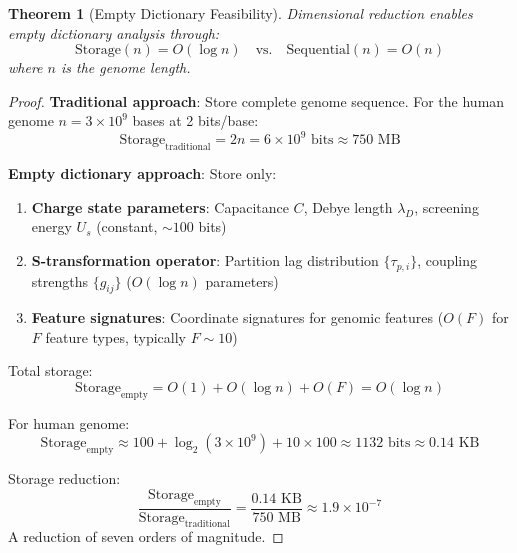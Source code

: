 \documentclass[11pt,a4paper]{article}
\newtheorem{theorem}{Theorem}[section]
\theoremstyle{remark}
\begin{document}
\begin{theorem}[Empty Dictionary Feasibility]
\label{thm:empty_dictionary_feasibility}
Dimensional reduction enables empty dictionary analysis through:
\begin{equation}
\text{Storage}(n) = O(\log n) \quad \text{vs.} \quad \text{Sequential}(n) = O(n)
\end{equation}
where $n$ is the genome length.
\end{theorem}

\begin{proof}
\textbf{Traditional approach}: Store complete genome sequence. For the human genome $n = 3 \times 10^9$ bases at 2 bits/base:
\begin{equation}
\text{Storage}_{\text{traditional}} = 2n = 6 \times 10^9 \text{ bits} \approx 750 \text{ MB}
\end{equation}

\textbf{Empty dictionary approach}: Store only:
\begin{enumerate}
\item \textbf{Charge state parameters}: Capacitance $C$, Debye length $\lambda_D$, screening energy $U_s$ (constant, $\sim 100$ bits)
\item \textbf{S-transformation operator}: Partition lag distribution $\{\tau_{p,i}\}$, coupling strengths $\{g_{ij}\}$ ($O(\log n)$ parameters)
\item \textbf{Feature signatures}: Coordinate signatures for genomic features ($O(F)$ for $F$ feature types, typically $F \sim 10$)
\end{enumerate}

Total storage:
\begin{equation}
\text{Storage}_{\text{empty}} = O(1) + O(\log n) + O(F) = O(\log n)
\end{equation}

For human genome:
\begin{equation}
\text{Storage}_{\text{empty}} \approx 100 + \log_2(3 \times 10^9) + 10 \times 100 \approx 1132 \text{ bits} \approx 0.14 \text{ KB}
\end{equation}

Storage reduction:
\begin{equation}
\frac{\text{Storage}_{\text{empty}}}{\text{Storage}_{\text{traditional}}} = \frac{0.14 \text{ KB}}{750 \text{ MB}} \approx 1.9 \times 10^{-7}
\end{equation}
A reduction of seven orders of magnitude.
\end{proof}
\end{document}
